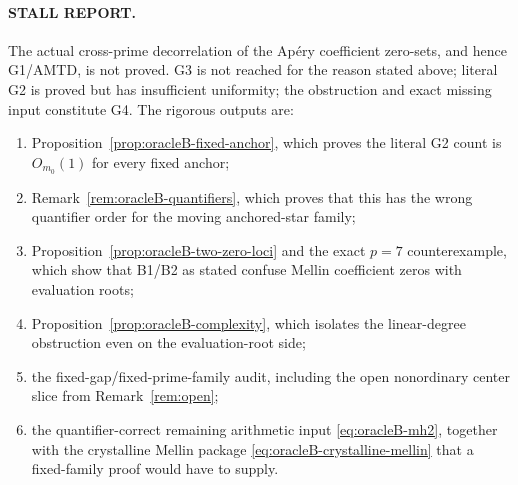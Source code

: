 \paragraph{STALL REPORT.}
The actual cross-prime decorrelation of the Ap\'ery coefficient zero-sets,
and hence G1/AMTD, is not proved.  G3 is not reached for the reason stated
above; literal G2 is proved but has insufficient uniformity; the obstruction
and exact missing input constitute G4.  The rigorous outputs are:
\begin{enumerate}
 \item Proposition~\ref{prop:oracleB-fixed-anchor}, which proves the
       literal G2 count is $O_{m_0}(1)$ for every fixed anchor;
 \item Remark~\ref{rem:oracleB-quantifiers}, which proves that this has
       the wrong quantifier order for the moving anchored-star family;
 \item Proposition~\ref{prop:oracleB-two-zero-loci} and the exact $p=7$
       counterexample, which show that B1/B2 as stated confuse Mellin
       coefficient zeros with evaluation roots;
 \item Proposition~\ref{prop:oracleB-complexity}, which isolates the
       linear-degree obstruction even on the evaluation-root side;
 \item the fixed-gap/fixed-prime-family audit, including the open
       nonordinary center slice from Remark~\ref{rem:open};
 \item the quantifier-correct remaining arithmetic input
       \eqref{eq:oracleB-mh2}, together with the crystalline Mellin package
       \eqref{eq:oracleB-crystalline-mellin} that a fixed-family proof would
       have to supply.
\end{enumerate}
